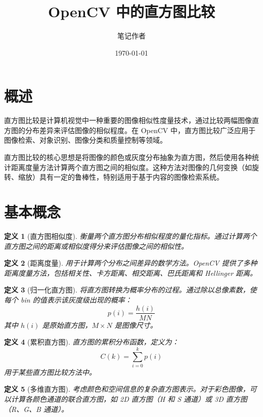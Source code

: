 \documentclass{article}
\title{\textbf{OpenCV 中的直方图比较}}
\author{笔记作者}
\date{\today}
\newtheorem{definition}{定义}[section]
\begin{document}
\maketitle

\tableofcontents
\newpage

\section{概述}

直方图比较是计算机视觉中一种重要的图像相似性度量技术，通过比较两幅图像直方图的分布差异来评估图像的相似程度。在 OpenCV 中，直方图比较广泛应用于图像检索、对象识别、图像分类和质量控制等领域。

直方图比较的核心思想是将图像的颜色或灰度分布抽象为直方图，然后使用各种统计距离度量方法计算两个直方图之间的相似度。这种方法对图像的几何变换（如旋转、缩放）具有一定的鲁棒性，特别适用于基于内容的图像检索系统。

\section{基本概念}

\begin{definition}[直方图相似度]
衡量两个直方图分布相似程度的量化指标。通过计算两个直方图之间的距离或相似度得分来评估图像之间的相似性。
\end{definition}

\begin{definition}[距离度量]
用于计算两个分布之间差异的数学方法。OpenCV 提供了多种距离度量方法，包括相关性、卡方距离、相交距离、巴氏距离和 Hellinger 距离。
\end{definition}

\begin{definition}[归一化直方图]
将直方图转换为概率分布的过程。通过除以总像素数，使每个 bin 的值表示该灰度级出现的概率：
\[
p(i) = \frac{h(i)}{MN}
\]
其中 $h(i)$ 是原始直方图，$M \times N$ 是图像尺寸。
\end{definition}

\begin{definition}[累积直方图]
直方图的累积分布函数，定义为：
\[
C(k) = \sum_{i=0}^{k} p(i)
\]
用于某些直方图比较方法中。
\end{definition}

\begin{definition}[多维直方图]
考虑颜色和空间信息的复杂直方图表示。对于彩色图像，可以计算各颜色通道的联合直方图，如 2D 直方图（H 和 S 通道）或 3D 直方图（R、G、B 通道）。
\end{definition}
\end{document}
